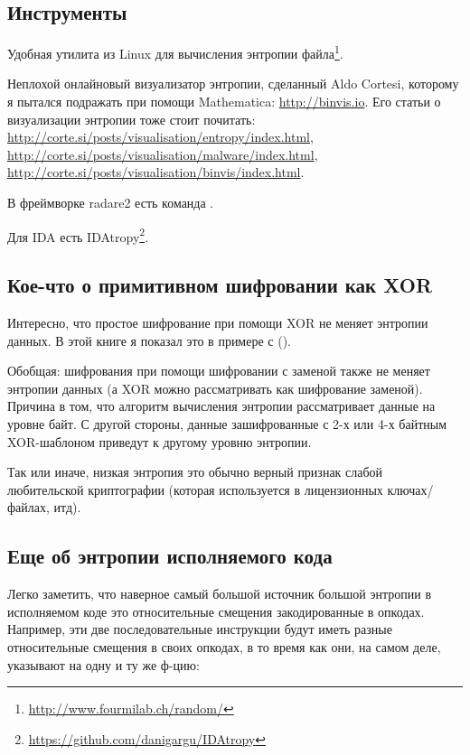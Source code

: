 \subsection{Инструменты}

Удобная утилита из Linux  для вычисления энтропии файла\footnote{\url{http://www.fourmilab.ch/random/}}.

Неплохой онлайновый визуализатор энтропии, сделанный Aldo Cortesi,
которому я пытался подражать при помощи Mathematica: \url{http://binvis.io}.
Его статьи о визуализации энтропии тоже стоит почитать:
\url{http://corte.si/posts/visualisation/entropy/index.html},
\url{http://corte.si/posts/visualisation/malware/index.html},
\url{http://corte.si/posts/visualisation/binvis/index.html}.

В фреймворке radare2 есть команда .

Для IDA есть IDAtropy\footnote{\url{https://github.com/danigargu/IDAtropy}}.

\subsection{Кое-что о примитивном шифровании как XOR}

Интересно, что простое шифрование при помощи XOR не меняет энтропии данных.
В этой книге я показал это в примере с  ().

Обобщая: шифрования при помощи шифровании с заменой также не меняет энтропии данных
(а XOR можно рассматривать как шифрование заменой).
Причина в том, что алгоритм вычисления энтропии рассматривает данные на уровне байт.
С другой стороны, данные зашифрованные с 2-х или 4-х байтным XOR-шаблоном приведут к другому уровню энтропии.

Так или иначе, низкая энтропия это обычно верный признак слабой любительской криптографии
(которая используется в лицензионных ключах/файлах, итд).

\subsection{Еще об энтропии исполняемого кода}

Легко заметить, что наверное самый большой источник большой энтропии в исполняемом коде это
относительные смещения закодированные в опкодах.
Например, эти две последовательные инструкции будут иметь разные относительные смещения в своих опкодах,
в то время как они, на самом деле, указывают на одну и ту же ф-цию:


